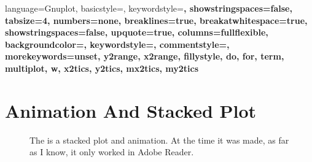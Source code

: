 \documentclass[10pt,a4paper,final]{report}
\begin{document}
\lstset
{
language=Gnuplot,
basicstyle=\ttfamily\scriptsize,
keywordstyle=\bfseries,
showstringspaces=false,
tabsize=4,
numbers=none,
breaklines=true,
breakatwhitespace=true,
showstringspaces=false,
upquote=true,
columns=fullflexible, %
backgroundcolor=\color{gray!10},
keywordstyle=\color{CodeRed},
commentstyle=\color{CodeGreen},
morekeywords={unset, y2range, x2range, fillystyle, do, for, term, multiplot, w, x2tics, y2tics, mx2tics, my2tics}
}



\tableofcontents

\section{Animation And Stacked Plot}
\begin{figure}[htbp]
    \centering
    \caption{The is a stacked plot and animation.  At the time it was made, as far as I know, it only worked in Adobe Reader.}
\end{figure}

\end{document}

